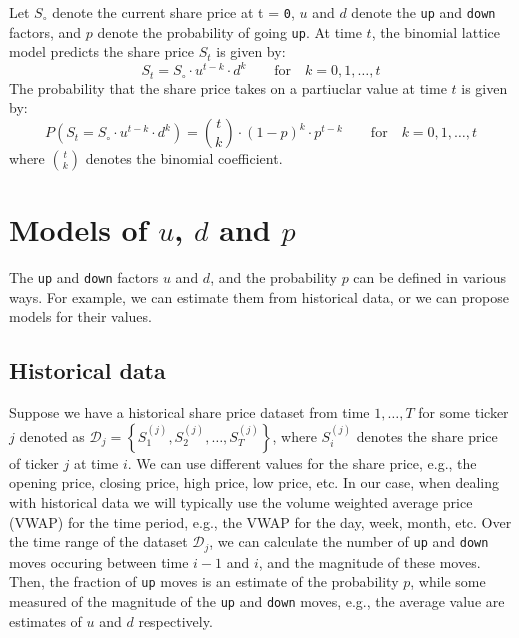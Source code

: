 \documentclass[11pt]{article}
\theoremstyle{definition}
\begin{document}
\begin{definition}\label{defn-binomial-distribution}
	Let $S_{\circ}$ denote the current share price at t = \texttt{0}, $u$ and $d$ denote the \texttt{up} and \texttt{down} factors, 
	and $p$ denote the probability of going \texttt{up}.
	At time $t$, the binomial lattice model predicts the share price $S_{t}$ is given by:
	\begin{equation*}
	S_{t} = S_{\circ}\cdot{u}^{t-k}\cdot{d}^{k}\qquad\text{for}\quad{k=0,1,\dots,t}
	\end{equation*}
	The probability that the share price takes on a partiuclar value at time $t$ is given by:
	\begin{equation*}
	P(S_{t} = S_{\circ}\cdot{u}^{t-k}\cdot{d}^{k}) = \binom{t}{k}\cdot{(1-p)}^{k}\cdot{p}^{t-k}\qquad\text{for}\quad{k=0,1,\dots,t}
	\end{equation*}
	where $\binom{t}{k}$ denotes the binomial coefficient.
\end{definition}

\section*{Models of $u$, $d$ and $p$}
The \texttt{up} and \texttt{down} factors $u$ and $d$, and the probability $p$ can be defined in various ways.  
For example, we can estimate them from historical data, or we can propose models for their values. 

\subsection*{Historical data}
Suppose we have a historical share price dataset from time $1,\dots,T$ for some ticker $j$ denoted as $\mathcal{D}_{j} = \left\{S^{(j)}_{1},S^{(j)}_{2},\dots,S^{(j)}_{T}\right\}$, 
where $S^{(j)}_{i}$ denotes the share price of ticker $j$ at time $i$.
We can use different values for the share price, e.g., the opening price, closing price, high price, low price, etc. 
In our case, when dealing with historical data we will typically use the volume weighted average price (VWAP) for the time period, 
e.g., the VWAP for the day, week, month, etc. Over the time range of the dataset $\mathcal{D}_{j}$, we can calculate the number of \texttt{up} and \texttt{down} moves
occuring between time $i-1$ and $i$, and the magnitude of these moves. 
Then, the fraction of \texttt{up} moves is an estimate of the probability $p$, 
while some measured of the magnitude of the \texttt{up} and \texttt{down} moves, e.g., the average value are estimates of $u$ and $d$ respectively.
\end{document}
